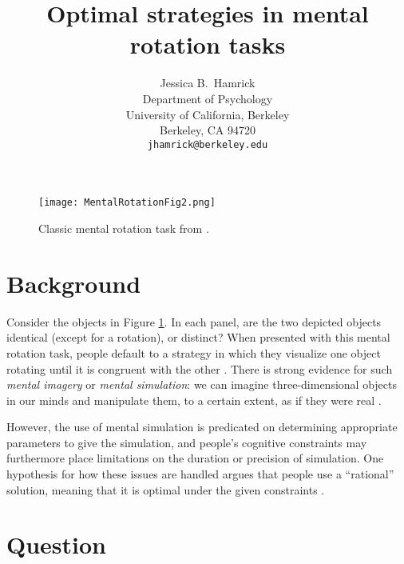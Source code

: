 \documentclass{article} %
\title{Optimal strategies in mental rotation tasks}
\author{Jessica B.~Hamrick\\
  Department of Psychology\\
  University of California, Berkeley\\
  Berkeley, CA 94720\\
  \texttt{jhamrick@berkeley.edu}}
\begin{document}
\maketitle


\begin{figure}[h]
  \begin{center}
    \texttt{[image: MentalRotationFig2.png]}
  \end{center}
  \caption{Classic mental rotation task from \cite{Shepard1971}.}
  \label{fig:mental-rotation}
\end{figure}

\section{Background}



Consider the objects in Figure \ref{fig:mental-rotation}. In each
panel, are the two depicted objects identical (except for a rotation),
or distinct? When presented with this mental rotation task, people
default to a strategy in which they visualize one object rotating until
it is congruent with the other \cite{Shepard1971}. There is strong
evidence for such \textit{mental imagery} or \textit{mental
  simulation}: we can imagine three-dimensional objects in our minds
and manipulate them, to a certain extent, as if they were real
\cite{Kosslyn:2009tj}.

However, the use of mental simulation is predicated on determining
appropriate parameters to give the simulation, and people's cognitive
constraints may furthermore place limitations on the duration or
precision of simulation. One hypothesis for how these issues are
handled argues that people use a ``rational'' solution, meaning that
it is optimal under the given constraints
\cite{Lieder:2012wg,Vul:2009wy,Griffiths2012a}.

\section{Question}
\end{document}
